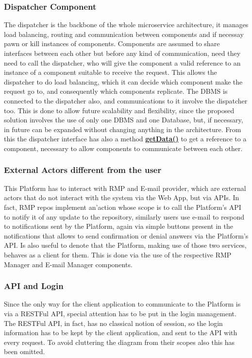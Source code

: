 \subsubsection{Dispatcher Component} \label{parr:dispatcher}
The dispatcher is the backbone of the whole microservice architecture, it manages load balancing, routing and communication between components and if necessay pawn or kill instances of components. 
Components are assumed to share interfaces between each other but before any kind of communication, need they need to call the dispatcher, who will give the component a valid reference to an instance of a component suitable to receive the request.
This allows the dispatcher to do load balancing, which it can decide which component make the request go to, and consequently which components replicate.
The DBMS is connected to the dispatcher also, and communications to it involve the dispatcher too. 
This is done to allow future scalability and flexibility, since the proposed solution involves the use of only one DBMS and one Database, but, if necessary, in future can be expanded without changing anything in the architecture.
From this the dispatcher interface has also a method \hyperref[meth:dispGetData]{\textbf{getData()}} to get a reference to a component, necessary to allow components to communicate between each other.\\
\subsubsection{External Actors different from the user} 
This Platform has to interact with RMP and E-mail provider, which are external actors that do not interact with the system via the Web App, but via APIs.
In fact, RMP repos implement an'action whose scope is to call the Platform's API to notify it of any update to the repository, similarly users use e-mail to respond to notifications sent by the Platform, again via simple buttons present in the notifications that allows to send confirmation or denial answers via the Platform's API.
Is also useful to denote that the Platform, making use of those two services, behaves as a client for them. This is done via the use of the respective RMP Manager and E-mail Manager components.
\subsubsection{API and Login}
Since the only way for the client application to communicate to the Platform is via a RESTFul API, special attention has to be put in the login management.
The RESTFul API, in fact, has no classical notion of session, so the login information has to be kept by the client application, and sent to the API with every request. To avoid cluttering the diagram from their scopes also this has been omitted.
